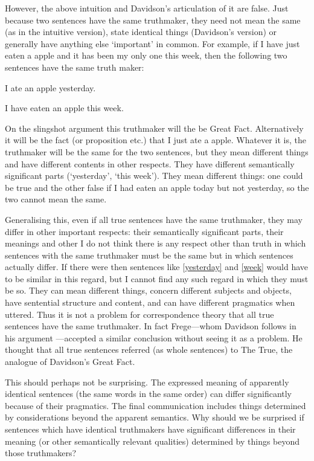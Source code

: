 However, the above intuition and Davidson's articulation of it are false.
Just because two sentences have the same truthmaker, they need not mean the same (as in the intuitive version), state identical things (Davidson's version) or generally have anything else `important' in common.
For example, if I have just eaten a apple and it has been my only one this week, then the following two sentences have the same truth maker:

	\begin{example}\label{yesterday}
	I ate an apple yesterday.
	\end{example}

	\begin{example}\label{week}
	I have eaten an apple this week.
	\end{example}

On the slingshot argument this truthmaker will the be Great Fact.
Alternatively it will be the fact (or proposition etc.) that I just ate a apple.
Whatever it is, the truthmaker will be the same for the two sentences, but they mean different things and have different contents in other respects.
They have different semantically significant parts (`yesterday', `this week').
They mean different things: one could be true and the other false if I had eaten an apple today but not yesterday, so the two cannot mean the same.

Generalising this, even if all true sentences have the same truthmaker, they may differ in other important respects: their semantically significant parts, their meanings and other I do not think there is any respect other than truth in which sentences with the same truthmaker must be the same but in which sentences actually differ.
If there were then sentences like \ref{yesterday} and \ref{week} would have to be similar in this regard, but I cannot find any such regard in which they must be so.
They can mean different things, concern different subjects and objects, have sentential structure and content, and can have different pragmatics when uttered.
Thus it is not a problem for correspondence theory that all true sentences have the same truthmaker.
In fact Frege---whom Davidson follows in his argument \parencite[750]{Davidson_1969}---accepted a similar conclusion without seeing it as a problem.
He thought that all true sentences referred (as whole sentences) to The True, the analogue of Davidson's Great Fact.
\parencite[216]{Frege_1948}

This should perhaps not be surprising.
The expressed meaning of apparently identical sentences (the same words in the same order) can differ significantly because of their pragmatics.
The final communication includes things determined by considerations beyond the apparent semantics.
Why should we be surprised if sentences which have identical truthmakers have significant differences in their meaning (or other semantically relevant qualities) determined by things beyond those truthmakers?

